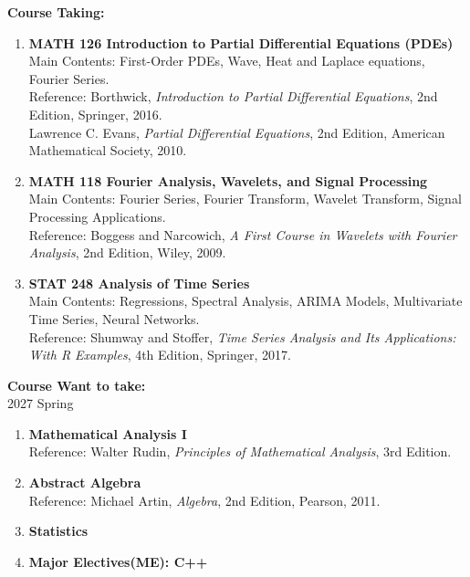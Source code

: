 \documentclass{scrartcl}
\begin{document}
\textbf{Course Taking:}
\begin{enumerate}
    \item \textbf{MATH 126 Introduction to Partial Differential Equations (PDEs)}
    \\Main Contents: First-Order PDEs, Wave, Heat and Laplace equations, Fourier Series.
    \\Reference: 
    Borthwick, \textit{Introduction to Partial Differential Equations}, 2nd Edition, Springer, 2016.
    \\
    Lawrence C. Evans, \textit{Partial Differential Equations}, 2nd Edition, American Mathematical Society, 2010.
    \item \textbf{MATH 118 Fourier Analysis, Wavelets, and Signal Processing}
    \\Main Contents: Fourier Series, Fourier Transform, Wavelet Transform, Signal Processing Applications.
    \\Reference: Boggess and Narcowich, \textit{A First Course in Wavelets with Fourier Analysis}, 2nd Edition, Wiley, 2009.
    \item \textbf{STAT 248 Analysis of Time Series}
    \\Main Contents: Regressions, Spectral Analysis, ARIMA Models, Multivariate Time Series, Neural Networks.
    \\Reference: Shumway and Stoffer, \textit{Time Series Analysis and Its Applications: With R Examples}, 4th Edition, Springer, 2017.
\end{enumerate}


\newpage
\textbf{Course Want to take:}
\\2027 Spring
\begin{enumerate}
    \item \textbf{Mathematical Analysis I}
    \\Reference: Walter Rudin, \textit{Principles of Mathematical Analysis}, 3rd Edition.
    \item \textbf{Abstract Algebra}
    \\Reference: Michael Artin, \textit{Algebra}, 2nd Edition, Pearson, 2011.
    \item \textbf{Statistics}
    \item \textbf{Major Electives(ME): C++} 
\end{enumerate}
\end{document}
